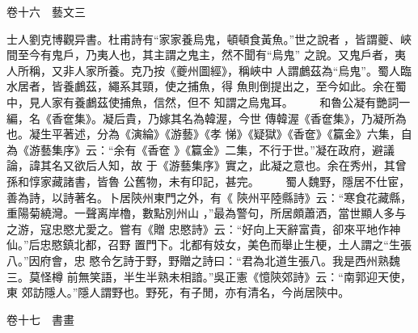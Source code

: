 \documentclass{ctexart}
\begin{document}
卷十六　藝文三

士人劉克博觀异書。杜甫詩有``家家養烏鬼，頓頓食黃魚。''世之說者 ，皆謂夔、峽間至今有鬼戶，乃夷人也，其主謂之鬼主，然不聞有``烏鬼'' 之說。又鬼戶者，夷人所稱，又非人家所養。克乃按《夔州圖經》，稱峽中 人謂鸕茲為``烏鬼''。蜀人臨水居者，皆養鸕茲，繩系其頸，使之捕魚，得 魚則倒提出之，至今如此。余在蜀中，見人家有養鸕茲使捕魚，信然，但不 知謂之烏鬼耳。 　　和魯公凝有艷詞一編，名《香奩集》。凝后貴，乃嫁其名為韓渥，今世 傳韓渥《香奩集》，乃凝所為也。凝生平著述，分為《演綸》《游藝》《孝 悌》《疑獄》《香奩》《籯金》六集，自為《游藝集序》云：``余有《香奩 》《籯金》二集，不行于世。''凝在政府，避議論，諱其名又欲后人知，故 于《游藝集序》實之，此凝之意也。余在秀州，其曾孫和惇家藏諸書，皆魯 公舊物，未有印記，甚完。 　　蜀人魏野，隱居不仕宦，善為詩，以詩著名。卜居陝州東門之外，有《 陝州平陸縣詩》云：``寒食花藏縣，重陽菊繞灣。一聲离岸櫓，數點別州山 ，''最為警句，所居頗蕭洒，當世顯人多与之游，寇忠愍尤愛之。嘗有《贈 忠愍詩》云：``好向上天辭富貴，卻來平地作神仙。''后忠愍鎮北都，召野 置門下。北都有妓女，美色而舉止生梗，土人謂之``生張八。''因府會，忠 愍令乞詩于野，野贈之詩曰：``君為北道生張八。我是西州熟魏三。莫怪樽 前無笑語，半生半熟未相諳。''吳正憲《憶陝郊詩》云：``南郭迎天使，東 郊訪隱人。''隱人謂野也。野死，有子閒，亦有清名，今尚居陝中。

卷十七　書畫
\end{document}
